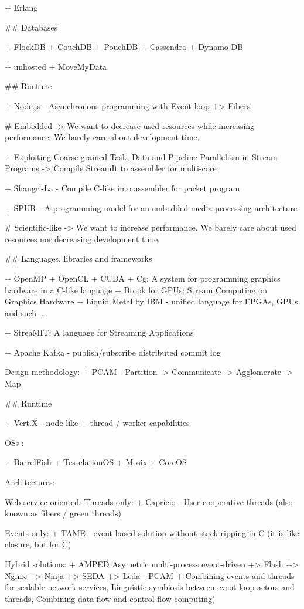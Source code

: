   + Erlang

## Databases

  + FlockDB
  + CouchDB
  + PouchDB
  + Cassendra
  + Dynamo DB

  + unhosted
  + MoveMyData

## Runtime

  + Node.js - Asynchronous programming with Event-loop
  +> Fibers 


# Embedded -> We want to decrease used resources while increasing performance. We barely care about development time.



+ Exploiting Coarse-grained Task, Data and Pipeline Parallelism in Stream Programs -> Compile StreamIt to assembler for multi-core

+ Shangri-La - Compile C-like into assembler for packet program

+ SPUR - A programming model for an embedded media processing architecture


# Scientific-like -> We want to increase performance. We barely care about used resources nor decreasing development time.

## Languages, libraries and frameworks

  + OpenMP
  + OpenCL
  + CUDA
  + Cg: A system for programming graphics hardware in a C-like language
  + Brook for GPUs: Stream Computing on Graphics Hardware
  + Liquid Metal by IBM - unified language for FPGAs, GPUs and such ...

  + StreaMIT: A language for Streaming Applications


  + Apache Kafka - publish/subscribe distributed commit log

  Design methodology:
  + PCAM - Partition -> Communicate -> Agglomerate -> Map

## Runtime

  + Vert.X - node like + thread / worker capabilities

  OSs :

  + BarrelFish
  + TesselationOS
  + Mosix
  + CoreOS


  Architectures:


    Web service oriented:
      Threads only:
      + Capricio - User cooperative threads (also known as fibers / green threads)

      Events only:
      + TAME - event-based solution without stack ripping in C (it is like closure, but for C)

      Hybrid solutions:
    + AMPED Asymetric multi-process event-driven
    +> Flash
    +> Nginx
    +> Ninja
    +> SEDA
    +> Leda - PCAM 
    + Combining events and threads for scalable network services, Linguistic symbiosis between event loop actors and threads, Combining data flow and control flow computing)

